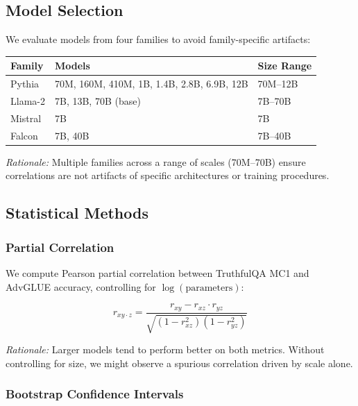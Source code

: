 \subsection{Model Selection}

We evaluate models from four families to avoid family-specific artifacts:

\begin{table}[h]
\centering
\begin{tabular}{lll}
\toprule
\textbf{Family} & \textbf{Models} & \textbf{Size Range} \\
\midrule
Pythia & 70M, 160M, 410M, 1B, 1.4B, 2.8B, 6.9B, 12B & 70M--12B \\
Llama-2 & 7B, 13B, 70B (base) & 7B--70B \\
Mistral & 7B & 7B \\
Falcon & 7B, 40B & 7B--40B \\
\bottomrule
\end{tabular}
\end{table}

\emph{Rationale:} Multiple families across a range of scales (70M--70B) ensure correlations are not artifacts of specific architectures or training procedures.

\subsection{Statistical Methods}

\subsubsection{Partial Correlation}

We compute Pearson partial correlation between TruthfulQA MC1 and AdvGLUE accuracy, controlling for $\log(\text{parameters})$:

\begin{equation}
r_{xy \cdot z} = \frac{r_{xy} - r_{xz} \cdot r_{yz}}{\sqrt{(1 - r_{xz}^2)(1 - r_{yz}^2)}}
\end{equation}

\emph{Rationale:} Larger models tend to perform better on both metrics. Without controlling for size, we might observe a spurious correlation driven by scale alone.

\subsubsection{Bootstrap Confidence Intervals}

